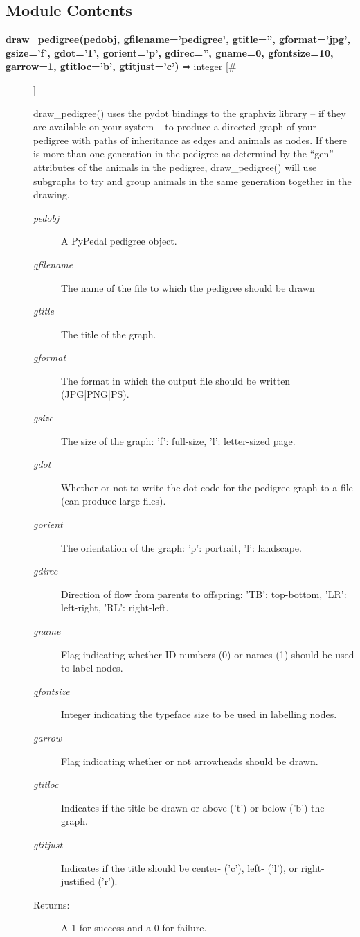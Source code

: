 \documentclass[10pt]{article}
\begin{document}
\subsection*{Module Contents}
\begin{description}
\item[\textbf{draw\_pedigree(pedobj, gfilename='pedigree', gtitle='', gformat='jpg', gsize='f', gdot='1', gorient='p', gdirec='', gname=0, gfontsize=10, garrow=1, gtitloc='b', gtitjust='c')}
 ⇒ integer [\#]]

 draw\_pedigree() uses the pydot bindings to the graphviz library -- if they are available on your system -- to produce a directed graph of your pedigree with paths of inheritance as edges and animals as nodes. If there is more than one generation in the pedigree as determind by the ``gen'' attributes of the animals in the pedigree, draw\_pedigree() will use subgraphs to try and group animals in the same generation together in the drawing.
\begin{description}
\item[\emph{pedobj}
] A PyPedal pedigree object.
\item[\emph{gfilename}
] The name of the file to which the pedigree should be drawn
\item[\emph{gtitle}
] The title of the graph.
\item[\emph{gformat}
] The format in which the output file should be written (JPG|PNG|PS).
\item[\emph{gsize}
] The size of the graph: 'f': full-size, 'l': letter-sized page.
\item[\emph{gdot}
] Whether or not to write the dot code for the pedigree graph to a file (can produce large files).
\item[\emph{gorient}
] The orientation of the graph: 'p': portrait, 'l': landscape.
\item[\emph{gdirec}
] Direction of flow from parents to offspring: 'TB': top-bottom, 'LR': left-right, 'RL': right-left.
\item[\emph{gname}
] Flag indicating whether ID numbers (0) or names (1) should be used to label nodes.
\item[\emph{gfontsize}
] Integer indicating the typeface size to be used in labelling nodes.
\item[\emph{garrow}
] Flag indicating whether or not arrowheads should be drawn.
\item[\emph{gtitloc}
] Indicates if the title be drawn or above ('t') or below ('b') the graph.
\item[\emph{gtitjust}
] Indicates if the title should be center- ('c'), left- ('l'), or right-justified ('r').
\item[Returns:] A 1 for success and a 0 for failure.


\end{description}
\end{description}
\end{document}
